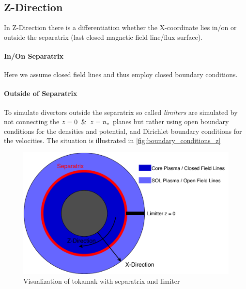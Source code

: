 \documentclass[master.tex]{subfiles}
\begin{document}
\subsection{Z-Direction}
In Z-Direction there is a differentiation whether the X-coordinate lies in/on or outside the separatrix (last closed magnetic field line/flux surface).
\paragraph{In/On Separatrix}
Here we assume closed field lines and thus employ closed boundary conditions.
\paragraph{Outside of Separatrix}
To simulate divertors outside the separatrix so called \textit{limiters} are simulated\cite{Ribeiro_2008_Limiter} by not connecting the $z=0 \And z=n_z$ planes but rather using open boundary conditions for the densities and potential, and Dirichlet boundary conditions for the velocities. The situation is illustrated in \autoref{fig:boundary_conditions_z}
\begin{figure}[ht]
    \centering
    \includegraphics[width=\linewidth]{pdfs/boundary_conditions_z.pdf}
    \caption{Visualization of tokamak with separatrix and limiter}
    \label{fig:boundary_conditions_z}
\end{figure}
\end{document}
